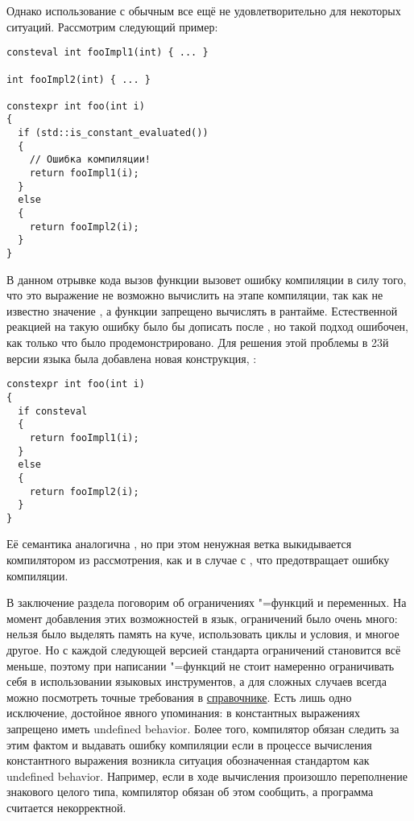 Однако использование  с обычным  все ещё не удовлетворительно для некоторых ситуаций.
Рассмотрим следующий пример:
\begin{verbatim}
consteval int fooImpl1(int) { ... }

int fooImpl2(int) { ... }

constexpr int foo(int i)
{
  if (std::is_constant_evaluated())
  {
    // Ошибка компиляции!
    return fooImpl1(i);
  }
  else
  {
    return fooImpl2(i);
  }
}
\end{verbatim}
В данном отрывке кода вызов функции  вызовет ошибку компиляции в силу того, что это выражение не возможно вычислить на этапе компиляции, так как не известно значение , а  функции запрещено вычислять в рантайме.
Естественной реакцией на такую ошибку было бы дописать  после , но такой подход ошибочен, как только что было продемонстрировано.
Для решения этой проблемы в 23й версии языка была добавлена новая конструкция, :
\begin{verbatim}
constexpr int foo(int i)
{
  if consteval
  {
    return fooImpl1(i);
  }
  else
  {
    return fooImpl2(i);
  }
}
\end{verbatim}
Её семантика аналогична , но при этом ненужная ветка выкидывается компилятором из рассмотрения, как и в случае с , что предотвращает ошибку компиляции.

В заключение раздела поговорим об ограничениях "=функций и переменных.
На момент добавления этих возможностей в язык, ограничений было очень много: нельзя было выделять память на куче, использовать циклы и условия, и многое другое.
Но с каждой следующей версией стандарта ограничений становится всё меньше, поэтому при написании "=функций не стоит намеренно ограничивать себя в использовании языковых инструментов, а для сложных случаев всегда можно посмотреть точные требования в \href{https://en.cppreference.com/w/cpp/language/constexpr#:~:text=A%20constexpr%20function%20must%20satisfy%20the%20following%20requirements%3A}{справочнике}.
Есть лишь одно исключение, достойное явного упоминания: в константных выражениях запрещено иметь undefined behavior.
Более того, компилятор обязан следить за этим фактом и выдавать ошибку компиляции если в процессе вычисления константного выражения возникла ситуация обозначенная стандартом как undefined behavior.
Например, если в ходе вычисления произошло переполнение знакового целого типа, компилятор обязан об этом сообщить, а программа считается некорректной.


